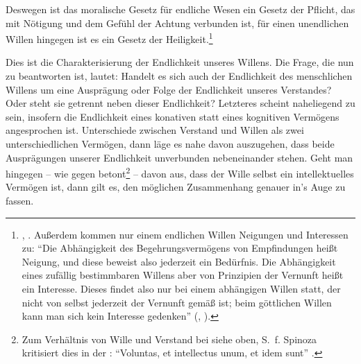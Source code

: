 Deswegen ist das moralische Gesetz für endliche Wesen ein Gesetz der Pflicht,
das mit Nötigung und dem Gefühl der Achtung verbunden ist, für einen unendlichen
Willen hingegen ist es ein Gesetz der Heiligkeit.\footnote{\cite[][A
146]{Kant:KritikderpraktischenVernunft1974}, \cite[][V:
82.8--12]{Kant:GesammelteWerke1900ff.}. Außerdem kommen nur einem endlichen Willen Neigungen und Interessen zu: \enquote{Die Abhängigkeit des
Begehrungsvermögens von Empfindungen heißt Neigung, und diese beweist also jederzeit ein Bedürfnis. Die Abhängigkeit eines zufällig
bestimmbaren Willens aber von Prinzipien der Vernunft heißt ein Interesse.
Dieses findet also nur bei einem abhängigen Willen statt, der nicht von selbst
jederzeit der Vernunft gemäß ist; beim göttlichen Willen kann man sich kein
Interesse gedenken} \mkbibparens{\cite[][BA
38]{Kant:GrundlegungzurMetaphysikderSitten1965}, \cite[][IV:
413.26--31]{Kant:GesammelteWerke1900ff.}}.}

Dies ist die Charakterisierung der Endlichkeit unseres Willens. Die Frage, die nun zu beantworten ist, lautet:
Handelt es sich auch der Endlichkeit des menschlichen Willens um eine Ausprägung oder Folge der
Endlichkeit unseres Verstandes? Oder steht sie getrennt neben dieser
Endlichkeit? Letzteres scheint naheliegend zu sein, insofern die Endlichkeit eines konativen
statt eines kognitiven Vermögens angesprochen ist. Unterschiede
 zwischen Verstand und Willen als zwei unterschiedlichen
Vermögen, dann läge es nahe davon auszugehen, dass beide Ausprägungen unserer Endlichkeit unverbunden
nebeneinander stehen. Geht man hingegen -- wie
 gegen
 betont\footnote{Zum Verhältnis von
Wille und Verstand bei  siehe oben,
S. \pageref{Absatz:DescarteszuEndlichkeitundVerhaeltnisvonWilleundVerstand}\,f.
Spinoza kritisiert dies in der :
\enquote{Voluntas, et intellectus unum, et idem sunt} \parencite[][\nopp
2p49c]{Spinoza:EthikingeometrischerOrdnungdargestellt2007}.} -- davon aus, dass
der Wille selbst ein intellektuelles Vermögen ist, dann gilt es, den möglichen
Zusammenhang genauer in's Auge zu fassen.

